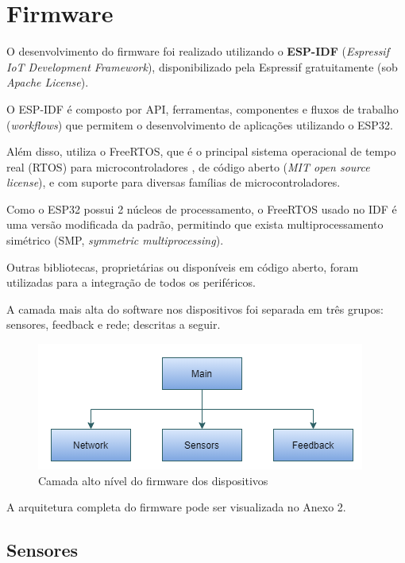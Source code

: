 \documentclass[../monografia.tex]{subfiles}
\begin{document}
\section{Firmware} \label{firmware}

O desenvolvimento do firmware foi realizado utilizando o \textbf{ESP-IDF} (\textit{Espressif IoT Development Framework}), disponibilizado pela Espressif \cite{esp-idf} gratuitamente (sob \textit{Apache License}). 

O ESP-IDF é composto por API, ferramentas, componentes e fluxos de trabalho (\textit{workflows}) que permitem o desenvolvimento de aplicações utilizando o ESP32. 

Além disso, utiliza o FreeRTOS, que é o principal sistema operacional de tempo real (RTOS) para microcontroladores \cite{freertos}, de código aberto (\textit{MIT open source license}), e com suporte para diversas famílias de microcontroladores.

Como o ESP32 possui 2 núcleos de processamento, o FreeRTOS usado no IDF é uma versão modificada da padrão, permitindo que exista multiprocessamento simétrico (SMP, \textit{symmetric multiprocessing}).

Outras bibliotecas, proprietárias ou disponíveis em código aberto, foram utilizadas para a integração de todos os periféricos. 

A camada mais alta do software nos dispositivos foi separada em três grupos: sensores, feedback e rede; descritas a seguir. %

\begin{figure}[h!]
	\centering
	\includegraphics[scale=0.8]{fw-arch-1}
	\caption{Camada alto nível do firmware dos dispositivos}
	\label{fig:fw-arch}
\end{figure}

A arquitetura completa do firmware pode ser visualizada no Anexo 2. %

\subsection{Sensores} %
\end{document}
